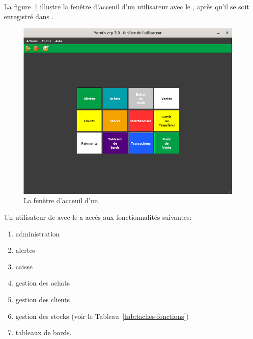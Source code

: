 \label{sec:utilisateurs-lepatron}

La figure~\ref{fig:yeren-fenetre-patron} illustre la fen\^etre
d'acceuil d'un utilisateur avec le \role \manager, 
apr\`es qu'il se soit enregistr\'e dans \yeren.\\

\begin{figure}[!htbp]
\centering
\includegraphics[scale=0.63]{images/yeroth-fenetre-manager.png}
\caption{La fen\^etre d'acceuil d'un \manager}
\label{fig:yeren-fenetre-patron}
\end{figure}

Un utilisateur de \yeren avec le \role \manager a acc\`es
aux fonctionnalit\'es suivantes:
\begin{enumerate}[1)]
	\item administration
	\item alertes
	\item caisse
	\item gestion des achats
	\item gestion des clients
	\item gestion des stocks (voir le Tableau~\ref{tab:taches-fonctions})
	\item tableaux de bords.\\
\end{enumerate}